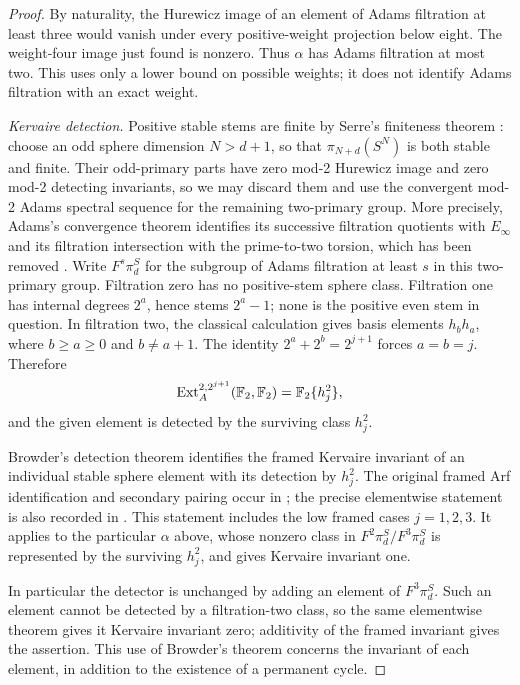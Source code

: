 \begin{proof}
By naturality, the Hurewicz image of an element of Adams filtration
at least three would vanish under every positive-weight projection
below eight. The weight-four
image just found is nonzero. Thus \(\alpha\) has Adams filtration
at most two. This uses only a lower bound on possible weights; it does
not identify Adams filtration with an exact weight.

\emph{Kervaire detection.}
Positive stable stems are finite by Serre's finiteness theorem
\cite[Chapter~V, \S3, Proposition~3]{Serre1951}: choose an odd
sphere dimension \(N>d+1\), so that \(\pi_{N+d}(S^N)\) is both
stable and finite. Their odd-primary parts have zero
mod-2 Hurewicz image and zero mod-2 detecting invariants, so we may
discard them and use the convergent mod-2 Adams spectral sequence for
the remaining two-primary group. More precisely, Adams's convergence
theorem identifies its successive filtration quotients with
\(E_\infty\) and its filtration intersection with the prime-to-two
torsion, which has been removed
\cite[Theorem~2.1(i),(v),(vi)]{Adams1958}.
Write \(F^s\pi_d^S\) for the subgroup of Adams filtration at least
\(s\) in this two-primary group. Filtration zero has no positive-stem
sphere class. Filtration one has internal degrees \(2^a\), hence
stems \(2^a-1\); none is the positive even stem in question. In
filtration two, the classical calculation
\cite[Theorem~2.5.1(1)--(2)]{Adams1960} gives basis elements \(h_bh_a\),
where \(b\ge a\ge0\) and \(b\ne a+1\). The identity
\(2^a+2^b=2^{j+1}\) forces \(a=b=j\). Therefore
\[
\operatorname{Ext}_A^{2,2^{j+1}}(\mathbb F_2,\mathbb F_2)=\mathbb F_2\{h_j^2\},
\]
and the given element is detected by the surviving class \(h_j^2\).

Browder's detection theorem identifies the framed Kervaire invariant
of an individual stable sphere element with its detection by
\(h_j^2\). The original framed Arf identification and secondary
pairing occur in \cite[Theorem~3.2, Proposition~7.6 and
Theorems~7.7--7.8]{Browder1969}; the precise elementwise statement is
also recorded in \cite[Theorem~1.1]{BHHM2020}.
This statement includes the low framed cases \(j=1,2,3\).
It applies to the particular \(\alpha\) above, whose nonzero class
in \(F^2\pi_d^S/F^3\pi_d^S\) is represented by the surviving
\(h_j^2\), and gives Kervaire invariant one.

In particular the detector is unchanged by adding an element of
\(F^3\pi_d^S\). Such an element cannot be detected by a
filtration-two class, so the same elementwise theorem gives it
Kervaire invariant zero; additivity of the framed invariant gives
the assertion. This use of Browder's theorem concerns the invariant
of each element, in addition to the existence of a permanent cycle.
\end{proof}

